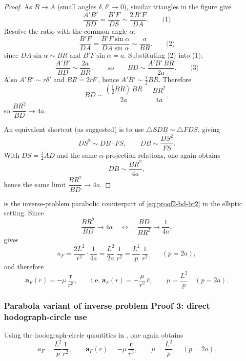 \begin{proof}
As $B\to A$ (small angles $\delta,\delta'\to 0$), similar triangles in the figure give
\[
  \frac{A'B'}{BD}=\frac{B'F}{DS}\sim \frac{2\,B'F}{DA}.
  \qquad\text{(1)}
\]
Resolve the ratio with the common angle $\alpha$:
\[
  \frac{B'F}{DA}
  =
  \frac{B'F\sin\alpha}{DA\sin\alpha}
  \sim \frac{a}{BR}.
  \qquad\text{(2)}
\]
since $DA\sin\alpha\sim BR$ and $B'F\sin\alpha=a$. Substituting (2) into (1),
\[
  \frac{A'B'}{BD}\sim \frac{2a}{BR},
  \qquad\text{so}\qquad
  BD\sim \frac{A'B'\,BR}{2a}.
  \qquad\text{(3)}
\]
Also $A'B'\sim r\delta'$ and $BR=2r\delta'$, hence $A'B'\sim \tfrac12 BR$. Therefore
\[
  BD\sim \frac{(\tfrac12 BR)\,BR}{2a}=\frac{BR^2}{4a},
\]
so $\dfrac{BR^2}{BD}\to 4a$.

An equivalent shortcut (as suggested) is to use $\triangle SDB\sim\triangle FDS$, giving
\[
  DS^2\sim DB\cdot FS,\qquad DB\sim \frac{DS^2}{FS}.
\]
With $DS=\tfrac12 AD$ and the same $\alpha$-projection relations, one again obtains
\[
  DB\sim \frac{BR^2}{4a},
\]
hence the same limit $\dfrac{BR^2}{BD}\to 4a$.
\end{proof}

 is the inverse-problem parabolic counterpart of \eqref{eq:proof2-bd-br2} in the elliptic setting. Since
\[
  \frac{BR^2}{BD}\to 4a
  \quad\Longleftrightarrow\quad
  \frac{BD}{BR^2}\to \frac{1}{4a},
\]
 gives
\[
  a_F=\frac{2L^2}{r^2}\cdot\frac{1}{4a}
  =\frac{L^2}{2a}\,\frac{1}{r^2}
  =\frac{L^2}{p}\,\frac{1}{r^2}
  \qquad (p=2a),
\]
and therefore
\[
  \mathbf a_F(r)=-\mu\,\frac{\mathbf r}{r^3},
  \qquad
  \text{i.e. }\mathbf a_F(r)=-\frac{\mu}{r^2}\,\hat r,
  \qquad
  \mu=\frac{L^2}{p}
  \quad (p=2a).
\]

\subsubsection{Parabola variant of inverse problem Proof 3: direct hodograph-circle use}
\label{subsubsec:parabola-proof3}

\begin{proposition}
Using the hodograph-circle quantities in , one again obtains
\[
  a_F=\frac{L^2}{p}\frac{1}{r^2},
  \qquad
  \mathbf a_F(r)=-\mu\,\frac{\mathbf r}{r^3},
  \qquad
  \mu=\frac{L^2}{p},
  \quad (p=2a).
\]
\end{proposition}

